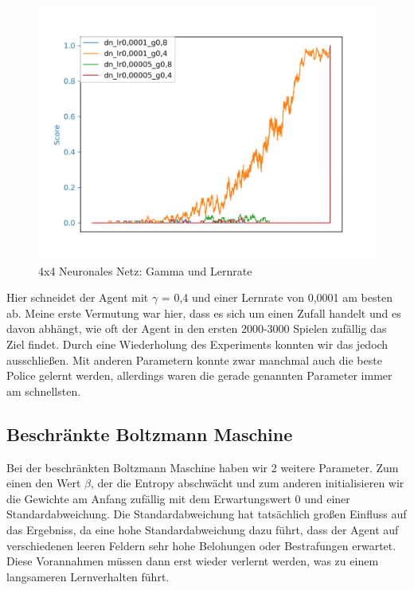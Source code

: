 \begin{figure}[H]
\centering
\includegraphics[width=\textwidth]{Figures/4x4_16_dn_lr0,0001_g0,8_dn_lr0,0001_g0,4_dn_lr0,00005_g0,8_dn_lr0,00005_g0,4.png}
\caption{4x4 Neuronales Netz: Gamma und Lernrate}
\label{dn5}
\end{figure}

Hier schneidet der Agent mit $\gamma$ = 0,4 und einer Lernrate von 0,0001 am besten ab. Meine erste Vermutung war hier, dass es sich um einen Zufall handelt und es davon abhängt, wie oft der Agent in den ersten 2000-3000 Spielen zufällig das Ziel findet. Durch eine Wiederholung des Experiments konnten wir das jedoch ausschließen. Mit anderen Parametern konnte zwar manchmal auch die beste Police gelernt werden, allerdings waren die gerade genannten Parameter immer am schnellsten.

\subsection{Beschränkte Boltzmann Maschine}
\label{subsec:dbm_r}

Bei der beschränkten Boltzmann Maschine haben wir 2 weitere Parameter. Zum einen den Wert $\beta$, der die Entropy abschwächt und zum anderen initialisieren wir die Gewichte am Anfang zufällig mit dem Erwartungswert 0 und einer Standardabweichung. Die Standardabweichung hat tatsächlich großen Einfluss auf das Ergebniss, da eine hohe Standardabweichung dazu führt, dass der Agent auf verschiedenen leeren Feldern sehr hohe Belohungen oder Bestrafungen erwartet. Diese Vorannahmen müssen dann erst wieder verlernt werden, was zu einem langsameren Lernverhalten führt.

